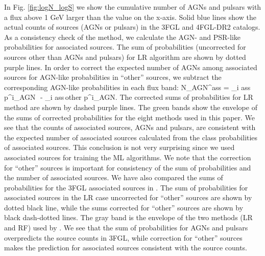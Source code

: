 In Fig. \ref{fig:logN_logS} we show the cumulative number of AGNs and pulsars with a flux above 1 GeV larger than the
value on the x-axis.
Solid blue lines show the actual counts of sources (AGNs or pulsars) in the 3FGL and 4FGL-DR2 catalogs.
As a consistency check of the method, we calculate the AGN- and PSR-like probabilities for associated sources.
The sum of probabilities (uncorrected for sources other than AGNs and pulsars) for LR algorithm are shown by dotted purple lines.
In order to correct the expected number of AGNs among associated sources for AGN-like probabilities in ``other'' sources, 
we subtract the corresponding AGN-like probabilities in each flux band:
\bea
{}
N_{\rm AGN}^{\rm ass}  = \sum_{i \in \rm ass} p^i_{\rm AGN}\,\, - \sum_{i \in \rm ass\,other} p^i_{\rm AGN}.
\eea
The corrected sums of probabilities for LR method are shown by dashed purple lines.
The green bands show the envelope of the sums of corrected probabilities for the eight methods used in this paper.
We see that the counts of associated sources, AGNs and pulsars, are consistent with the expected number of associated sources
calculated from the class probabilities of associated sources.
This conclusion is not very surprising since we used associated sources for training the ML algorithms.
We note that the correction for ``other'' sources is important for consistency of the sum of probabilities and the number of associated sources.
We have also compared the sums of probabilities for the 3FGL associated sources in \cite{2016ApJ...820....8S}.
The sum of probabilities for associated sources in the LR case uncorrected for ``other'' sources are shown by dotted black line,
while the sums corrected for ``other'' sources are shown by black dash-dotted lines.
The gray band is the envelope of the two methods (LR and RF) used by \cite{2016ApJ...820....8S}.
We see that the sum of probabilities for AGNs and pulsars overpredicts the source counts in 3FGL, 
while correction for ``other'' sources makes the prediction for associated sources consistent with the source counts.

